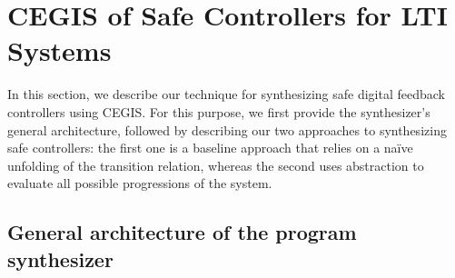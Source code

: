 \documentclass[runningheads,a4paper]{llncs}
\begin{document}
\section{CEGIS of Safe Controllers for LTI Systems} 
\label{sec:CEGARIS} 

In this section, we describe our technique for synthesizing safe digital
feedback controllers using CEGIS.  For this purpose, we first provide the
synthesizer's general architecture, followed by describing our two
approaches to synthesizing safe controllers: the first one is a baseline
approach that relies on a na\"ive unfolding of the transition relation,
whereas the second uses abstraction to evaluate all possible progressions of
the system.


 
\subsection{General architecture of the program synthesizer}
\label{synthesizer-general}
\end{document}
